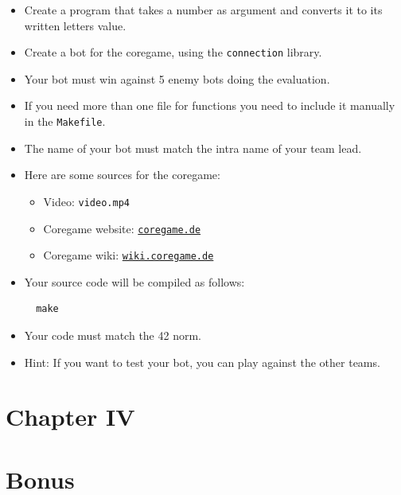 \documentclass[12pt]{article}
\begin{document}
\begin{itemize}
  \item Create a program that takes a number as argument and converts it to its written letters value.
  
  \item Create a bot for the coregame, using the \texttt{connection} library.
  
  \item Your bot must win against 5 enemy bots doing the evaluation.
  
  \item If you need more than one file for functions you need to include it manually in the \texttt{Makefile}.
  
  \item The name of your bot must match the intra name of your team lead.
  
  \item Here are some sources for the coregame:
  \begin{itemize}
    \item Video: \texttt{video.mp4}
    \item Coregame website: \href{https://coregame.de}{\texttt{coregame.de}}
    \item Coregame wiki: \href{https://wiki.coregame.de}{\texttt{wiki.coregame.de}}
  \end{itemize}
  
  \item Your source code will be compiled as follows:
  
  \begin{verbatim}
  make
  \end{verbatim}
  
  \item Your code must match the 42 norm.
  
  \item Hint: If you want to test your bot, you can play against the other teams.
\end{itemize}

\newpage

\section*{\LARGE Chapter IV}
\section*{\LARGE Bonus}
\end{document}
